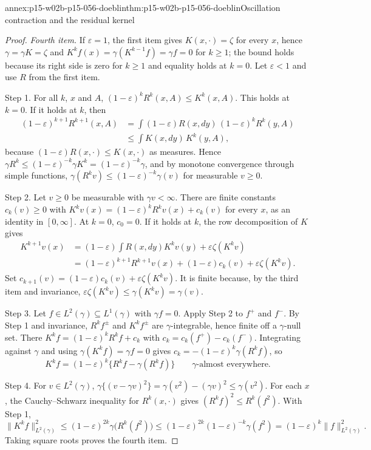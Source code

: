 \begin{annexitem}{annex:p15-w02b-p15-056-doeblin}{thm:p15-w02b-p15-056-doeblin}{Oscillation contraction and the residual kernel}
\begin{proof}
\emph{Fourth item.} If \(\varepsilon=1\), the first item gives
\(K(x,\cdot)=\zeta\) for every \(x\), hence \(\gamma=\gamma K=\zeta\) and
\(K^kf(x)=\gamma(K^{k-1}f)=\gamma f=0\) for \(k\geq1\); the bound holds
because its right side is zero for \(k\geq1\) and equality holds at
\(k=0\). Let \(\varepsilon<1\) and use \(R\) from the first item.

Step 1. For all \(k\), \(x\) and \(A\),
\((1-\varepsilon)^kR^k(x,A)\leq K^k(x,A)\). This holds at \(k=0\). If it
holds at \(k\), then
\[
\begin{split}
 (1-\varepsilon)^{k+1}R^{k+1}(x,A)
 &=\int(1-\varepsilon)R(x,dy)\,(1-\varepsilon)^kR^k(y,A)\\
 &\leq\int K(x,dy)\,K^k(y,A),
\end{split}
\]
because \((1-\varepsilon)R(x,\cdot)\leq K(x,\cdot)\) as measures. Hence
\(\gamma R^k\leq(1-\varepsilon)^{-k}\gamma K^k=(1-\varepsilon)^{-k}\gamma\),
and by monotone convergence through simple functions,
\(\gamma(R^kv)\leq(1-\varepsilon)^{-k}\gamma(v)\) for measurable
\(v\geq0\).

Step 2. Let \(v\geq0\) be measurable with \(\gamma v<\infty\). There are
finite constants \(c_k(v)\geq0\) with
\(K^kv(x)=(1-\varepsilon)^kR^kv(x)+c_k(v)\) for every \(x\), as an
identity in \([0,\infty]\). At \(k=0\), \(c_0=0\). If it holds at \(k\),
the row decomposition of \(K\) gives
\[
\begin{split}
 K^{k+1}v(x)&=(1-\varepsilon)\int R(x,dy)K^kv(y)+\varepsilon\zeta(K^kv)\\
 &=(1-\varepsilon)^{k+1}R^{k+1}v(x)+(1-\varepsilon)c_k(v)+\varepsilon\zeta(K^kv).
\end{split}
\]
Set \(c_{k+1}(v)=(1-\varepsilon)c_k(v)+\varepsilon\zeta(K^kv)\). It is
finite because, by the third item and invariance,
\(\varepsilon\zeta(K^kv)\leq\gamma(K^kv)=\gamma(v)\).

Step 3. Let \(f\in L^2(\gamma)\subseteq L^1(\gamma)\) with \(\gamma f=0\).
Apply Step 2 to \(f^+\) and \(f^-\). By Step 1 and invariance,
\(R^kf^\pm\) and \(K^kf^\pm\) are \(\gamma\)-integrable, hence finite off a
\(\gamma\)-null set. There
\(K^kf=(1-\varepsilon)^kR^kf+c_k\) with
\(c_k=c_k(f^+)-c_k(f^-)\). Integrating against \(\gamma\) and using
\(\gamma(K^kf)=\gamma f=0\) gives
\(c_k=-(1-\varepsilon)^k\gamma(R^kf)\), so
\[
 K^kf=(1-\varepsilon)^k\bigl\{R^kf-\gamma(R^kf)\bigr\}
 \qquad\gamma\text{-almost everywhere.}
\]

Step 4. For \(v\in L^2(\gamma)\),
\(\gamma\{(v-\gamma v)^2\}=\gamma(v^2)-(\gamma v)^2\leq\gamma(v^2)\).
For each \(x\),
the Cauchy--Schwarz inequality for \(R^k(x,\cdot)\) gives
\((R^kf)^2\leq R^k(f^2)\). With Step 1,
\[
 \|K^kf\|^2_{L^2(\gamma)}\leq(1-\varepsilon)^{2k}\gamma\bigl(R^k(f^2)\bigr)
 \leq(1-\varepsilon)^{2k}(1-\varepsilon)^{-k}\gamma(f^2)
 =(1-\varepsilon)^k\|f\|^2_{L^2(\gamma)} .
\]
Taking square roots proves the fourth item.
\end{proof}
\end{annexitem}

